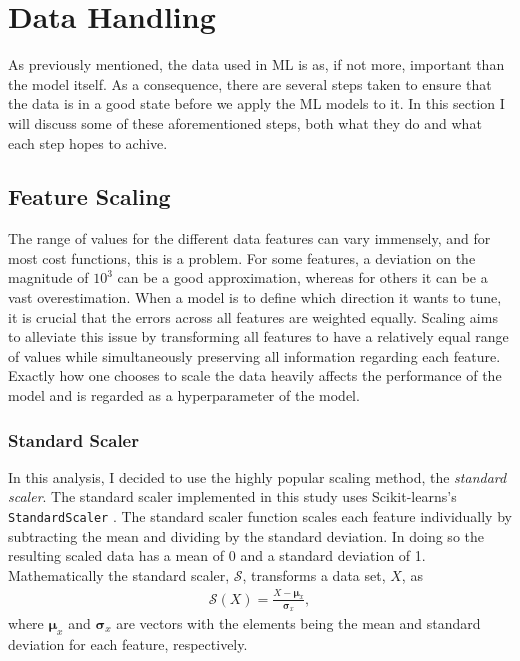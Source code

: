 \section{Data Handling}\label{subsec:Scaling}
As previously mentioned, the data used in \ac{ML} is as, if not more, important than the model itself. 
As a consequence, there are several steps taken to ensure that the data is in a good state before 
we apply the \ac{ML} models to it. In this section I will discuss some of these aforementioned steps, both 
what they do and what each step hopes to achive.
\subsection{Feature Scaling}
The range of values for the different data features can vary immensely, and for most 
cost functions, this is a problem. For some features, a deviation on the magnitude 
of $10^3$ can be a good approximation, whereas for others it can be a vast 
overestimation. When a model is to define which direction it wants to tune, it is 
crucial that the errors across all features are weighted equally. Scaling aims to alleviate 
this issue by transforming all features to have a relatively equal range of values while
simultaneously preserving all information regarding each feature. Exactly how one chooses 
to scale the data heavily affects the performance of the model and is regarded as a hyperparameter 
of the model. 
\subsubsection{Standard Scaler}\label{subsubsec:StandardScalar}
In this analysis, I decided to use the highly popular scaling method, the \emph{standard scaler}. 
The standard scaler implemented in this study uses Scikit-learns's \texttt{StandardScaler}
\cite{StandardScaler}. The standard scaler function scales each feature individually by subtracting 
the mean and dividing by the standard deviation. In doing so the resulting scaled data has a mean 
of 0 and a standard deviation of 1. Mathematically the standard scaler, $\mathcal{S}$, transforms 
a data set, $X$, as 
\begin{align}
    \mathcal{S} \left(X\right) = \frac{X - \boldsymbol{\mu} _x}{\boldsymbol{\sigma}_x} ,
\end{align}
where $\boldsymbol{\mu} _x$ and $\boldsymbol{\sigma}_x$ are vectors with the elements being 
the mean and standard deviation for each feature, respectively.
